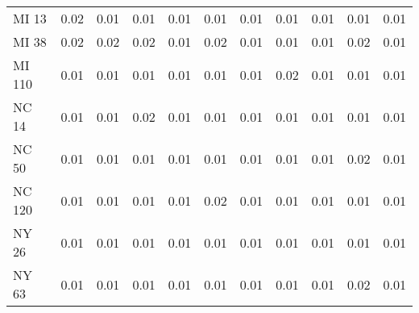 \begin{tabular}{lrrrrrrrrrr}
MI 13  &   0.02 &                         0.01 &                     0.01 &                     0.01 &                          0.01 &                       0.01 &                         0.01 &                                 0.01 &                          0.01 &                         0.01 \\
MI 38  &   0.02 &                         0.02 &                     0.02 &                     0.01 &                          0.02 &                       0.01 &                         0.01 &                                 0.01 &                          0.02 &                         0.01 \\
MI 110 &   0.01 &                         0.01 &                     0.01 &                     0.01 &                          0.01 &                       0.01 &                         0.02 &                                 0.01 &                          0.01 &                         0.01 \\
NC 14  &   0.01 &                         0.01 &                     0.02 &                     0.01 &                          0.01 &                       0.01 &                         0.01 &                                 0.01 &                          0.01 &                         0.01 \\
NC 50  &   0.01 &                         0.01 &                     0.01 &                     0.01 &                          0.01 &                       0.01 &                         0.01 &                                 0.01 &                          0.02 &                         0.01 \\
NC 120 &   0.01 &                         0.01 &                     0.01 &                     0.01 &                          0.02 &                       0.01 &                         0.01 &                                 0.01 &                          0.01 &                         0.01 \\
NY 26  &   0.01 &                         0.01 &                     0.01 &                     0.01 &                          0.01 &                       0.01 &                         0.01 &                                 0.01 &                          0.01 &                         0.01 \\
NY 63  &   0.01 &                         0.01 &                     0.01 &                     0.01 &                          0.01 &                       0.01 &                         0.01 &                                 0.01 &                          0.02 &                         0.01 \\

\end{tabular}
